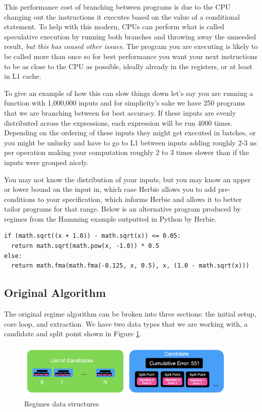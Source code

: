 \documentclass{article}
\begin{document}
This performance cost of branching between programs is due to the CPU changing out the instructions it executes based on the value of a conditional statement. To help with this modern, CPUs can perform what is called speculative execution by running both branches and throwing away the unneeded result, \textit{but this has caused other issues}. The program you are executing is likely to be called more than once so for best performance you want your next instructions to be as close to the CPU as possible, ideally already in the registers,  or at least in L1 cache.

To give an example of how this can slow things down let's say you are running a function with 1,000,000 inputs and for simplicity's sake we have 250 programs that we are branching between for best accuracy. If these inputs are evenly distributed across the expressions, each expression will be run 4000 times. Depending on the ordering of these inputs they might get executed in batches, or you might be unlucky and have to go to L1 between inputs adding roughly 2-3 ns per operation making your computation roughly 2 to 3 times slower than if the inputs were grouped nicely. 

You may not know the distribution of your inputs, but you may know an upper or lower bound on the input in, which case Herbie allows you to add pre-conditions to your specification, which informs Herbie and allows it to better tailor programs for that range. Below is an alternative program produced by regimes from the Hamming example outputted in Python by Herbie. 

\begin{center}
\begin{lstlisting}
if (math.sqrt((x + 1.0)) - math.sqrt(x)) <= 0.05:
  return math.sqrt(math.pow(x, -1.0)) * 0.5
else:
  return math.fma(math.fma(-0.125, x, 0.5), x, (1.0 - math.sqrt(x)))
\end{lstlisting}
\end{center}

\subsection{Original Algorithm}

The original regime algorithm can be broken into three sections: the initial setup, core loop, and extraction. We have two data types that we are working with, a candidate and split point shown in Figure \ref{fig:candidates}. 

\begin{figure}[htbp]
\begin{center}
\includegraphics[width=0.95\textwidth]{candidates.png}
\caption{Regimes data structures}
\label{fig:candidates}
\end{center}
\end{figure}
\end{document}
